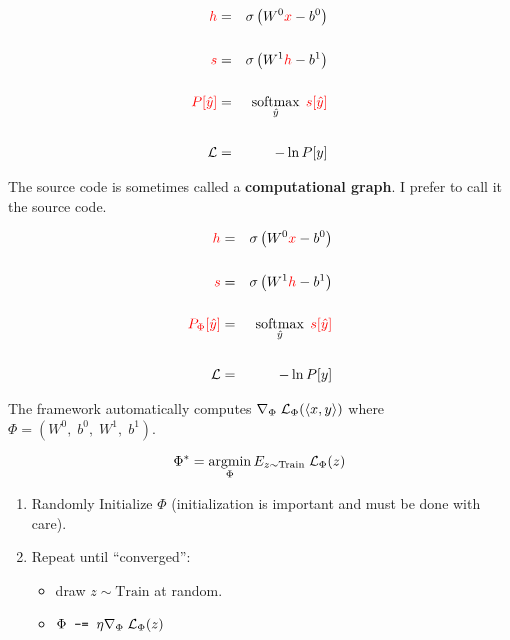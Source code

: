 {

\begin{eqnarray*}
  {\color{red} h} & = & \sigma\left(W^0{\color{red} x} - b^0\right) \\
  \\
  {\color{red} s} & = & \sigma\left(W^1{\color{red} h} - b^1 \right) \\
  \\
  {\color{red} P[\hat{y}]} & = & \operatorname*{softmax}_{\hat{y}}\;{\color{red} s[\hat{y}]} \\
  \\
  {\cal L} & = & - \ln P[y]
\end{eqnarray*}

\vfill
The source code is sometimes called a {\bf computational graph}.  I prefer to call it the source code.


\begin{eqnarray*}
  {\color{red} h} & = & \sigma\left(W^0{\color{red} x} - b^0\right) \\
  \\
  {\color{red} s} & = & \sigma\left(W^1{\color{red} h} - b^1 \right) \\
  \\
  {\color{red} P_\Phi[\hat{y}]} & = & \operatorname*{softmax}_{\hat{y}}\;{\color{red} s[\hat{y}]} \\
  \\
  {\cal L} & = & - \ln P[y]
\end{eqnarray*}

\vfill
The framework automatically computes $\nabla_\Phi \; {\cal L}_\Phi({\mbox{$\langle x,y\rangle$}})$
where $\Phi = (W^0,\;b^0,\;W^1,\;b^1)$.


$$\Phi^* = \operatorname*{argmin}_\Phi E_{z \sim \mathrm{Train}} \; {\cal L}_\Phi(z)$$

\vfill
\begin{enumerate}
\item Randomly Initialize $\Phi$ (initialization is important and must be done with care).

  \vfill
  \item Repeat until ``converged'':

    \vfill
    \begin{itemize}
    \item draw $z \sim \mathrm{Train}$ at random.
      \vfill
    \item $\Phi \;\;\mbox{\tt -=}\;\; \eta \nabla_\Phi\;{\cal L}_\Phi(z)$
    \end{itemize}
\end{enumerate}

}
